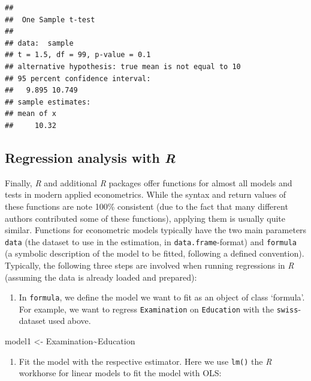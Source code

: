 \documentclass[
  12pt,
]{style/krantz}
\newenvironment{Shaded}{\begin{snugshade}}{\end{snugshade}}
\newcommand{\NormalTok}[1]{#1}
\newcommand{\OtherTok}[1]{\textcolor[rgb]{0.56,0.35,0.01}{#1}}
\newcommand{\SpecialCharTok}[1]{\textcolor[rgb]{0.00,0.00,0.00}{#1}}
\providecommand{\tightlist}{%
  \setlength{\itemsep}{0pt}\setlength{\parskip}{0pt}}
\begin{document}
\begin{verbatim}
## 
##  One Sample t-test
## 
## data:  sample
## t = 1.5, df = 99, p-value = 0.1
## alternative hypothesis: true mean is not equal to 10
## 95 percent confidence interval:
##   9.895 10.749
## sample estimates:
## mean of x 
##     10.32
\end{verbatim}

\hypertarget{regression-analysis-with-r}{%
\subsection{\texorpdfstring{Regression analysis with \emph{R}}{Regression analysis with R}}\label{regression-analysis-with-r}}

Finally, \emph{R} and additional \emph{R} packages offer functions for almost all models and tests in modern applied econometrics. While the syntax and return values of these functions are note 100\% consistent (due to the fact that many different authors contributed some of these functions), applying them is usually quite similar. Functions for econometric models typically have the two main parameters \texttt{data} (the dataset to use in the estimation, in \texttt{data.frame}-format) and \texttt{formula} (a symbolic description of the model to be fitted, following a defined convention). Typically, the following three steps are involved when running regressions in \emph{R} (assuming the data is already loaded and prepared):

\begin{enumerate}
\def\labelenumi{\arabic{enumi}.}
\tightlist
\item
  In \texttt{formula}, we define the model we want to fit as an object of class `formula'. For example, we want to regress \texttt{Examination} on \texttt{Education} with the \texttt{swiss}-dataset used above.
\end{enumerate}

\begin{Shaded}
\begin{Highlighting}[]
\NormalTok{model1 }\OtherTok{\textless{}{-}}\NormalTok{ Examination}\SpecialCharTok{\textasciitilde{}}\NormalTok{Education}
\end{Highlighting}
\end{Shaded}

\begin{enumerate}
\def\labelenumi{\arabic{enumi}.}
\setcounter{enumi}{1}
\tightlist
\item
  Fit the model with the respective estimator. Here we use \texttt{lm()} the \emph{R} workhorse for linear models to fit the model with OLS:
\end{enumerate}
\end{document}
